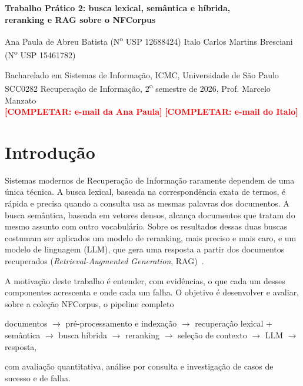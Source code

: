 \documentclass[11pt,a4paper]{article}
\newcommand{\completar}[1]{\textcolor{red}{\textbf{[COMPLETAR: #1]}}}
\begin{document}
\begin{center}
{\Large\bfseries Trabalho Prático 2: busca lexical, semântica e híbrida,\\[0.15em] reranking e RAG sobre o NFCorpus\par}
\vspace{0.7em}
{\normalsize Ana Paula de Abreu Batista (N\textsuperscript{o} USP 12688424) \quad
Italo Carlos Martins Bresciani (N\textsuperscript{o} USP 15461782)\par}
\vspace{0.3em}
{\small Bacharelado em Sistemas de Informação, ICMC, Universidade de São Paulo\\
SCC0282 Recuperação de Informação, 2\textsuperscript{o} semestre de 2026, Prof. Marcelo Manzato\\
\completar{e-mail da Ana Paula} \quad \completar{e-mail do Italo}\par}
\end{center}
\vspace{0.3em}

\section{Introdução}

Sistemas modernos de Recuperação de Informação raramente dependem de uma única técnica. A busca lexical, baseada na correspondência exata de termos, é rápida e precisa quando a consulta usa as mesmas palavras dos documentos. A busca semântica, baseada em vetores densos, alcança documentos que tratam do mesmo assunto com outro vocabulário. Sobre os resultados dessas duas buscas costumam ser aplicados um modelo de reranking, mais preciso e mais caro, e um modelo de linguagem (LLM), que gera uma resposta a partir dos documentos recuperados (\emph{Retrieval-Augmented Generation}, RAG)~\cite{lewis2020}.

A motivação deste trabalho é entender, com evidências, o que cada um desses componentes acrescenta e onde cada um falha. O objetivo é desenvolver e avaliar, sobre a coleção NFCorpus, o pipeline completo
\begin{center}
\small documentos $\rightarrow$ pré-processamento e indexação $\rightarrow$ recuperação lexical + semântica $\rightarrow$ busca híbrida $\rightarrow$ reranking $\rightarrow$ seleção de contexto $\rightarrow$ LLM $\rightarrow$ resposta,
\end{center}
com avaliação quantitativa, análise por consulta e investigação de casos de sucesso e de falha.
\end{document}
